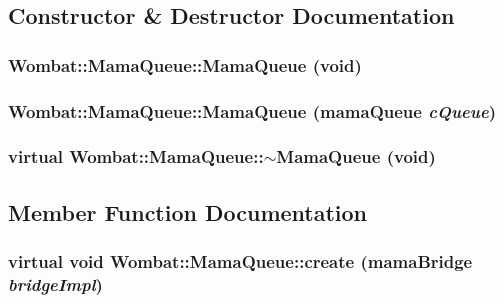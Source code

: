 \subsection{Constructor \& Destructor Documentation}
\hypertarget{classWombat_1_1MamaQueue_aca8edd15425492b3eafc994c6e65026b}{
\subsubsection[{MamaQueue}]{\setlength{\rightskip}{0pt plus 5cm}Wombat::MamaQueue::MamaQueue (void)}}
\label{classWombat_1_1MamaQueue_aca8edd15425492b3eafc994c6e65026b}
\hypertarget{classWombat_1_1MamaQueue_af6ce3367fa838bf1514c10afc3e164e5}{
\subsubsection[{MamaQueue}]{\setlength{\rightskip}{0pt plus 5cm}Wombat::MamaQueue::MamaQueue (mamaQueue {\em cQueue})}}
\label{classWombat_1_1MamaQueue_af6ce3367fa838bf1514c10afc3e164e5}
\hypertarget{classWombat_1_1MamaQueue_ab8a03d3c726605d29e77c42196c9a0e9}{
\subsubsection[{$\sim$MamaQueue}]{\setlength{\rightskip}{0pt plus 5cm}virtual Wombat::MamaQueue::$\sim$MamaQueue (void)}}
\label{classWombat_1_1MamaQueue_ab8a03d3c726605d29e77c42196c9a0e9}


\subsection{Member Function Documentation}
\hypertarget{classWombat_1_1MamaQueue_af9697625f1bf25772b29dd4c827c2991}{
\subsubsection[{create}]{\setlength{\rightskip}{0pt plus 5cm}virtual void Wombat::MamaQueue::create (mamaBridge {\em bridgeImpl})}}
\label{classWombat_1_1MamaQueue_af9697625f1bf25772b29dd4c827c2991}


